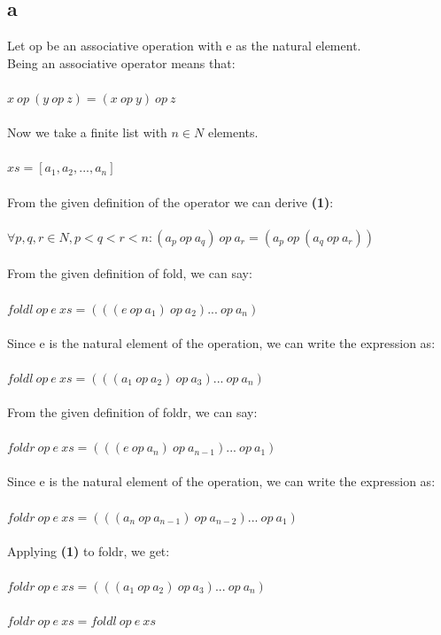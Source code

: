 \documentclass{article}
\begin{document}
	\subsection{a}
	Let op be an associative operation with e as the natural element.\\
	Being an associative operator means that:\\
	\\
    $x \  op \  (y \  op \  z) = (x \  op \  y) \ op \  z$\\
    \\
    Now we take a finite list with $n \in N$ elements.\\
    \\
    $xs = [a_1, a_2, ..., a_n]$\\
    \\
    From the given definition of the operator we can derive \textbf{(1)}:\\
    \\
    $\forall p, q, r \in N , p < q < r < n : (a_p \  op \  a_q) \  op \  a_r = (a_p \  op \  (a_q \  op \  a_r)) $\\
    \\
    From the given definition of fold, we can say:\\
    \\
    $foldl \  op \  e \  xs = (((e \  op \  a_1) \  op \  a_2)...\  op \  a_n)$\\
    \\
    Since e is the natural element of the operation, we can write the expression as:\\
    \\
    $foldl \  op \  e \  xs = (((a_1 \  op \  a_2) \  op \  a_3)...\  op \  a_n)$\\
    \\
    From the given definition of foldr, we can say:\\
    \\ 
    $foldr \  op \  e \  xs = (((e \  op \  a_n) \  op \  a_{n-1})...\  op \  a_1)$\\
    \\
    Since e is the natural element of the operation, we can write the expression as:\\
    \\
    $foldr \  op \  e \  xs = (((a_n \  op \  a_{n-1}) \  op \  a_{n-2})...\  op \  a_1)$\\
    \\
    Applying \textbf{(1)} to foldr, we get:\\
    \\
    $foldr \  op \  e \  xs = (((a_1 \  op \  a_2) \  op \  a_3)...\  op \  a_n)$\\
    \\
    $foldr \  op \  e \  xs = foldl \  op \  e \  xs$\\
    \\
\end{document}
